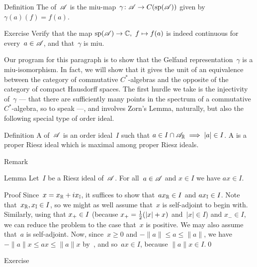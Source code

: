 \documentclass[a]{subfiles}
\begin{document}
\begin{parsec}
\begin{point}{Definition}
The 
of~$\mathscr{A}$
is the miu-map~$\gamma\colon \mathscr{A}\to C(\mathrm{sp}(\mathscr{A}))$
given by $\gamma(a)(f)=f(a)$.
\begin{point}{Exercise}%
Verify that 
 the map $\mathrm{sp}(\mathscr{A})\to \mathbb{C},\ f\mapsto f(a)$ is indeed
continuous for every~$a\in\mathscr{A}$,
and that~$\gamma$ is miu.
\end{point}
\end{point}
\begin{point}%
Our program for this paragraph is to show that
the Gelfand representation~$\gamma$ is 
a miu-isomorphism.
In fact,
we will show that it gives the unit
of an equivalence between the category of commutative $C^*$-algebras
and the opposite of the category of compact Hausdorff spaces.
The first hurdle we take is the injectivity of~$\gamma$
--- that there are sufficiently many
points in the spectrum of a commutative $C^*$-algebra,
so to speak ---,
and involves Zorn's Lemma,
naturally,
but also the following special type of order ideal.
\end{point}
\begin{point}{Definition}%
A  of~$\mathscr{A}$
is an order ideal~$I$
such that $a\in I\cap\mathscr{A}_{\mathbb{R}}\implies \left|a\right|\in I$.
A 
is a proper Riesz ideal which is maximal among
proper Riesz ideals.
\begin{point}{Remark}%
\end{point}
\end{point}
\begin{point}{Lemma}%
Let~$I$ be a Riesz ideal of~$\mathscr{A}$.
For all~$a\in \mathscr{A}$ and $x\in I$ we have $ax\in I$.
\begin{point}{Proof}%
Since~$x=x_{\mathbb{R}}+ix_{\mathbb{I}}$,
it suffices to show that~$ax_{\mathbb{R}}\in I$ and $ax_{\mathbb{I}}\in I$.
Note that~$x_{\mathbb{R}},x_{\mathbb{I}}\in I$,
so we might as well assume that~$x$ is self-adjoint to begin with.
Similarly, using that
 $x_{+}\in I$ (because $x_{+}=\frac{1}{2}(\left|x\right|+x)$
and~$\left|x\right|\in I$) and $x_-\in I$,
we can reduce the problem to the case that~$x$ is positive.
We may also assume that~$a$ is self-adjoint.
Now, since~$x\geq 0$ and $-\|a\|\leq a\leq \|a\|$,
we have $-\|a\|x \leq ax\leq \|a\|x$
by~,
and so~$ax\in I$,
because $\|a\|x\in I$.\qed
\end{point}
\end{point}
\begin{point}{Exercise}%

\end{point}
\end{parsec}
\end{document}
